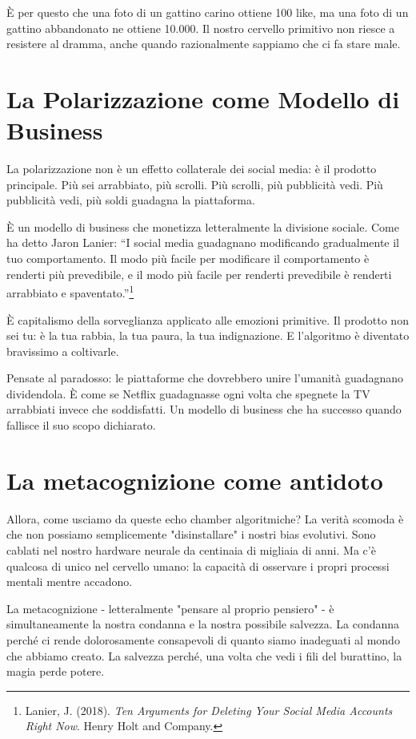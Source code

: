 È per questo che una foto di un gattino carino ottiene 100 like, ma una foto di un gattino abbandonato ne ottiene 10.000. Il nostro cervello primitivo non riesce a resistere al dramma, anche quando razionalmente sappiamo che ci fa stare male.

\section{La Polarizzazione come Modello di Business}

La polarizzazione non è un effetto collaterale dei social media: è il prodotto principale. Più sei arrabbiato, più scrolli. Più scrolli, più pubblicità vedi. Più pubblicità vedi, più soldi guadagna la piattaforma.

È un modello di business che monetizza letteralmente la divisione sociale. Come ha detto Jaron Lanier: ``I social media guadagnano modificando gradualmente il tuo comportamento. Il modo più facile per modificare il comportamento è renderti più prevedibile, e il modo più facile per renderti prevedibile è renderti arrabbiato e spaventato.''\footnote{Lanier, J. (2018). \textit{Ten Arguments for Deleting Your Social Media Accounts Right Now}. Henry Holt and Company.}

È capitalismo della sorveglianza applicato alle emozioni primitive. Il prodotto non sei tu: è la tua rabbia, la tua paura, la tua indignazione. E l'algoritmo è diventato bravissimo a coltivarle.

Pensate al paradosso: le piattaforme che dovrebbero unire l'umanità guadagnano dividendola. È come se Netflix guadagnasse ogni volta che spegnete la TV arrabbiati invece che soddisfatti. Un modello di business che ha successo quando fallisce il suo scopo dichiarato.

\section{La metacognizione come antidoto}


Allora, come usciamo da queste echo chamber algoritmiche? La verità scomoda è che non possiamo semplicemente "disinstallare" i nostri bias evolutivi. Sono cablati nel nostro hardware neurale da centinaia di migliaia di anni. Ma c'è qualcosa di unico nel cervello umano: la capacità di osservare i propri processi mentali mentre accadono.

La metacognizione - letteralmente "pensare al proprio pensiero" - è simultaneamente la nostra condanna e la nostra possibile salvezza. La condanna perché ci rende dolorosamente consapevoli di quanto siamo inadeguati al mondo che abbiamo creato. La salvezza perché, una volta che vedi i fili del burattino, la magia perde potere.

